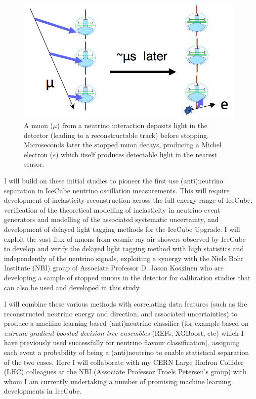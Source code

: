 \documentclass[a4paper,11pt]{article}
\begin{document}
\begin{figure} %
    \centering
    \includegraphics[trim=0.0cm 0.0cm 0.0cm 0.0cm, clip=true, width=\linewidth]{images/michel_electron.png}
    \caption{A muon ($\mu$) from a neutrino interaction deposits light in the detector (leading to a reconstructable track) before stopping. Microseconds later the stopped muon decays, producing a Michel electron ($e$) which itself produces detectable light in the nearest sensor. }
    \label{fig:michel_electron}
\end{figure}

I will build on these initial studies to pioneer the first use (anti)neutrino separation in IceCube neutrino oscillation measurements. This will require development of inelasticity reconstruction across the full energy-range of IceCube, verification of the theoretical modelling of inelasticity in neutrino event generators and modelling of the associated systematic uncertainty, and development of delayed light tagging methods for the IceCube Upgrade. I will exploit the vast flux of muons from cosmic ray air showers observed by IceCube to develop and verify the delayed light tagging method with high statistics and independently of the neutrino signals, exploiting a synergy with the Niels Bohr Institute (NBI) group of Associate Professor D. Jason Koskinen who are developing a sample of stopped muons in the detector for calibration studies that can also be used and developed in this study. 

I will combine these various methods with correlating data features (such as the reconstructed neutrino energy and direction, and associated uncertainties) to produce a machine learning based (anti)neutrino classifier (for example based on \textit{extreme gradient boosted decision tree ensembles} (REFs, XGBoost, etc) which I have previously used successfully for neutrino flavour classification), assigning each event a probability of being a (anti)neutrino to enable statistical separation of the two cases. Here I will collaborate with my CERN Large Hadron Collider (LHC) colleagues at the NBI (Associate Professor Troels Petersen's group) with whom I am currently undertaking a number of promising machine learning developments in IceCube.
\end{document}
